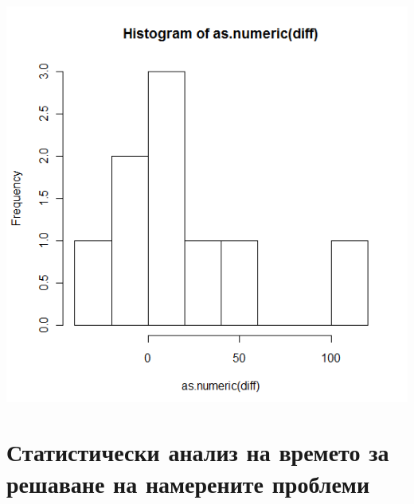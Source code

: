 \documentclass[a4paper,12pt,leqno]{article}
\begin{document}
\includegraphics{time_for_exploit}

\newpage
\section{Статистически анализ на времето за решаване на намерените проблеми}
\paragraph{}
\end{document}
